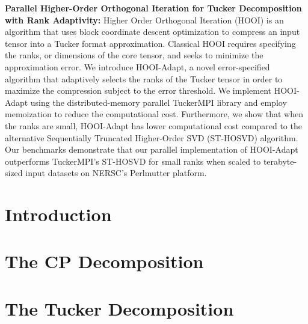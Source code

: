 \documentclass[MS]{wfuthesis}
\begin{document}
    \textbf{Parallel Higher-Order Orthogonal Iteration for Tucker Decomposition
    with Rank Adaptivity:} Higher Order Orthogonal Iteration (HOOI) is an
    algorithm that uses block coordinate descent optimization to compress an
    input tensor into a Tucker format approximation. Classical HOOI requires
    specifying the ranks, or dimensions of the core tensor, and seeks to
    minimize the approximation error. 	We introduce HOOI-Adapt, a novel
    error-specified algorithm that adaptively selects the ranks of the Tucker
    tensor in order to maximize the compression subject to the error threshold.
    We implement HOOI-Adapt using the distributed-memory parallel TuckerMPI
    library and employ memoization to reduce the computational cost.
    Furthermore, we show that when the ranks are small, HOOI-Adapt has lower
    computational cost compared to the alternative Sequentially Truncated
    Higher-Order SVD (ST-HOSVD) algorithm. Our benchmarks demonstrate that our
    parallel implementation of HOOI-Adapt outperforms TuckerMPI’s ST-HOSVD for
    small ranks when scaled to terabyte-sized input datasets on NERSC’s
    Perlmutter platform.





    \chapters{}
    \chapter{\textbf{Introduction}}
        
        \newpage





    \chapter{\textbf{The CP Decomposition}}
        
        \newpage





    \chapter{\textbf{The Tucker Decomposition}}
        
        \newpage





    \printbibliography
    




\end{document}
